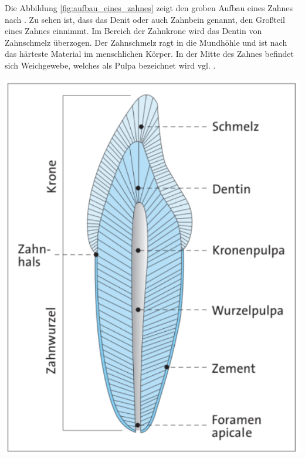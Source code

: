 \begin{minipage}{0.40\textwidth}
	Die Abbildung \ref{fig:aufbau_eines_zahnes} zeigt den groben Aufbau eines Zahnes
	nach \citet[Seite 17]{lehmann2012Zahnheilkunde}. Zu sehen ist, dass das Denit oder
	auch Zahnbein genannt, den Großteil eines Zahnes einnimmt. Im Bereich der Zahnkrone
	wird das Dentin von Zahnschmelz überzogen. Der Zahnschmelz ragt in die
	Mundhöhle und ist nach \citet[Seite 41]{lehmann2012Zahnheilkunde} das härteste
	Material im menschlichen Körper. In der Mitte des Zahnes befindet sich Weichgewebe,
	welches als Pulpa bezeichnet wird vgl. \citep[Seite ]{lehmann2012Zahnheilkunde}.
\end{minipage}
\hfill
\begin{minipage}{0.50\textwidth}
	\centering
	\includegraphics[scale=0.50]{img/aufbau_eines_zahns.jpg}
	 \label{fig:aufbau_eines_zahnes}
\end{minipage}

